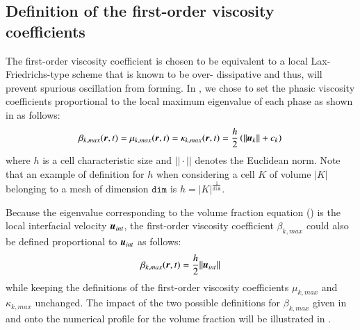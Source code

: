 \documentclass[preprint,10pt]{elsarticle}
\begin{document}
\subsection{Definition of the first-order viscosity coefficients}\label{sec:visc-coeff-fo}
%
The first-order viscosity coefficient is chosen to be equivalent to a local Lax-Friedrichs-type scheme that is known to be over-
dissipative and thus, will prevent spurious oscillation from forming. In \cite{Marco_paper_sem}, we chose to set the phasic viscosity 
coefficients proportional to the local maximum eigenvalue of each phase as shown in  as follows:
%
\begin{equation}\label{eq:visc-coeff-fo-def-1}
\beta_{k,max}(\boldsymbol r,t) = \mu_{k,max}(\boldsymbol r,t) = \kappa_{k,max}(\boldsymbol r,t) = \frac{h}{2} \left( || \boldsymbol u_k || + c_k \right)
\end{equation}
%
where $h$ is a cell characteristic size and $|| \cdot ||$ denotes the Euclidean norm. Note that an example of definition for $h$ when considering a 
cell $K$ of volume $|K|$ belonging to a mesh of dimension 
$\texttt{dim}$ is $h = |K|^\frac{1}{\texttt{dim}}$. 
%
\begin{remark}
Because the eigenvalue corresponding to the volume fraction equation () is the local interfacial velocity $\boldsymbol u_{int}$,
the first-order viscosity coefficient $\beta_{k,max}$ could also be defined proportional to $\boldsymbol u_{int}$ as follows:
%
\begin{equation}\label{eq:visc-coeff-fo-def-2}
\beta_{k,max}(\boldsymbol r,t) = \frac{h}{2} || \boldsymbol u_{int} ||
\end{equation}
%
while keeping the definitions of the first-order viscosity coefficients $\mu_{k,max}$ and $\kappa_{k,max}$ unchanged.
The impact of the two possible definitions for $\beta_{k,max}$ given in  and  onto the numerical 
profile for the volume fraction will be illustrated in .
\end{remark}
%
\end{document}
